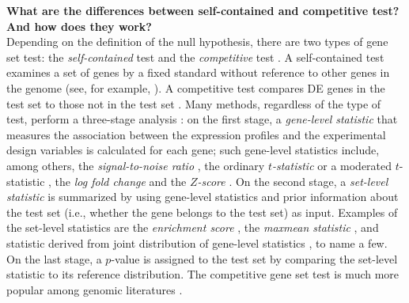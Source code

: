 \documentclass[useAMS,usenatbib, galley]{biom}
\begin{document}
	\textbf{What are the differences between self-contained and competitive test? And how does they work?}\\
	Depending on the definition of the null hypothesis, there are two types of gene set test: the \textit{self-contained} test and the \textit{competitive} test \citep{goeman2007analyzing}. A self-contained test examines a set of genes by a fixed standard without reference to other genes in the genome (see, for example, \cite{goeman2004global,goeman2005testing, tsai2009multivariate, wu2010roast, huang2013gene}). A competitive test compares DE
	genes in the test set to those not in the test set \citep{tian2005discovering, wu2012camera, yaari2013quantitative}. Many methods, regardless of the type of test, perform a three-stage analysis \citep{khatri2012ten}: on the first stage, a \textit{gene-level statistic} that measures the association between the expression profiles and the experimental design variables is calculated for each gene; such gene-level statistics include, among others, the \textit{signal-to-noise ratio} \citep{subramanian2005gene}, the ordinary \textit{$t$-statistic} \citep{tian2005discovering} or a moderated $t$-statistic \citep{Smyth2004moderated}, the \textit{log fold change} \citep{kim2005page} and the \textit{$Z$-score} \citep{efron2007correlation}. On the second stage, a \textit{set-level statistic} is summarized by using gene-level statistics and prior information about the test set (i.e., whether the gene belongs to the test set) as input. Examples of the set-level statistics are the \textit{enrichment score} \citep{subramanian2005gene}, the \textit{maxmean statistic} \citep{efron2007testing}, and statistic derived from joint distribution of gene-level statistics \citep{yaari2013quantitative}, to name a few. On the last stage, a $p$-value is assigned to the test set by comparing the set-level statistic to its reference distribution. The competitive gene set test is much more popular among genomic literatures \citep{goeman2007analyzing, gatti2010heading}.  
	
	
\end{document}
